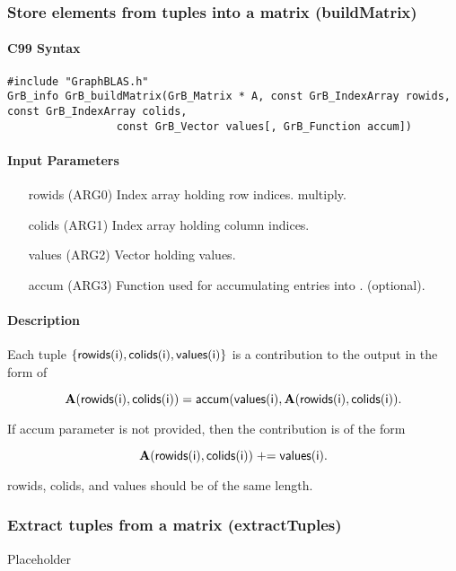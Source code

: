 \subsubsection{Store elements from tuples into a matrix ({\sf buildMatrix})}

\paragraph{C99 Syntax}

\begin{verbatim}
#include "GraphBLAS.h"
GrB_info GrB_buildMatrix(GrB_Matrix * A, const GrB_IndexArray rowids, const GrB_IndexArray colids, 
                 const GrB_Vector values[, GrB_Function accum])
\end{verbatim}



\paragraph{Input Parameters}

\begin{itemize}
	\item[{\sf rowids}] ({\sf ARG0}) Index array holding row indices. 
	multiply.

	\item[{\sf colids}] ({\sf ARG1}) Index array holding column indices. 

	\item[{\sf values}] ({\sf ARG2}) Vector holding values.  

	\item[{\sf accum}] ({\sf ARG3}) Function used for accumulating entries into . (optional). 
\end{itemize}

\paragraph{Description}
Each tuple $\{ {\sf rowids(i)}, {\sf colids(i)}, {\sf values(i)}\}$ is a contribution to the output in the form of 

$${\bf A}({\sf rowids(i)}, {\sf colids(i)}) = {\sf accum}({\sf values(i)}, {\bf A}({\sf rowids(i)}, {\sf colids(i)}).$$ 

If {\sf accum} parameter is not provided, then the contribution is of the form 

$${\bf A}({\sf rowids(i)}, {\sf colids(i)}) \mathrel{+}= {\sf values(i)}.$$
 
{\sf rowids}, {\sf colids}, and {\sf values} should be of the same length. 

\subsubsection{Extract tuples from a matrix ({\sf extractTuples})}

Placeholder


